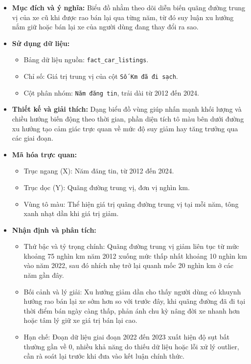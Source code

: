 \begin{itemize}
    \item \textbf{Mục đích và ý nghĩa:} Biểu đồ nhằm theo dõi diễn biến quãng đường trung vị của xe cũ khi được rao bán lại qua từng năm, từ đó suy luận xu hướng nắm giữ hoặc bán lại xe của người dùng đang thay đổi ra sao.

    \item \textbf{Sử dụng dữ liệu:}
    \begin{itemize}
        \item Bảng dữ liệu nguồn: \texttt{fact\_car\_listings}.
        \item Chỉ số: Giá trị trung vị của cột \texttt{Số Km đã đi sạch}.
        \item Cột phân nhóm: \texttt{Năm đăng tin}, trải dài từ 2012 đến 2024.
    \end{itemize}

    \item \textbf{Thiết kế và giải thích:} Dạng biểu đồ vùng giúp nhấn mạnh khối lượng và chiều hướng biến động theo thời gian, phần diện tích tô màu bên dưới đường xu hướng tạo cảm giác trực quan về mức độ suy giảm hay tăng trưởng qua các giai đoạn.

    \item \textbf{Mã hóa trực quan:}
    \begin{itemize}
        \item Trục ngang (X): Năm đăng tin, từ 2012 đến 2024.
        \item Trục dọc (Y): Quãng đường trung vị, đơn vị nghìn km.
        \item Vùng tô màu: Thể hiện giá trị quãng đường trung vị tại mỗi năm, tông xanh nhạt dần khi giá trị giảm.
    \end{itemize}

    \item \textbf{Nhận định và phân tích:}
    \begin{itemize}
        \item Thứ bậc và tỷ trọng chính: Quãng đường trung vị giảm liên tục từ mức khoảng 75 nghìn km năm 2012 xuống mức thấp nhất khoảng 10 nghìn km vào năm 2022, sau đó nhích nhẹ trở lại quanh mốc 20 nghìn km ở các năm gần đây.
        \item Bối cảnh và lý giải: Xu hướng giảm dần cho thấy người dùng có khuynh hướng rao bán lại xe sớm hơn so với trước đây, khi quãng đường đã đi tại thời điểm bán ngày càng thấp, phản ánh chu kỳ nâng đời xe nhanh hơn hoặc tâm lý giữ xe giá trị bán lại cao.
        \item Hạn chế: Đoạn dữ liệu giai đoạn 2022 đến 2023 xuất hiện độ sụt bất thường gần về 0, nhiều khả năng do thiếu dữ liệu hoặc lỗi xử lý outlier, cần rà soát lại trước khi đưa vào kết luận chính thức.
    \end{itemize}
\end{itemize}

